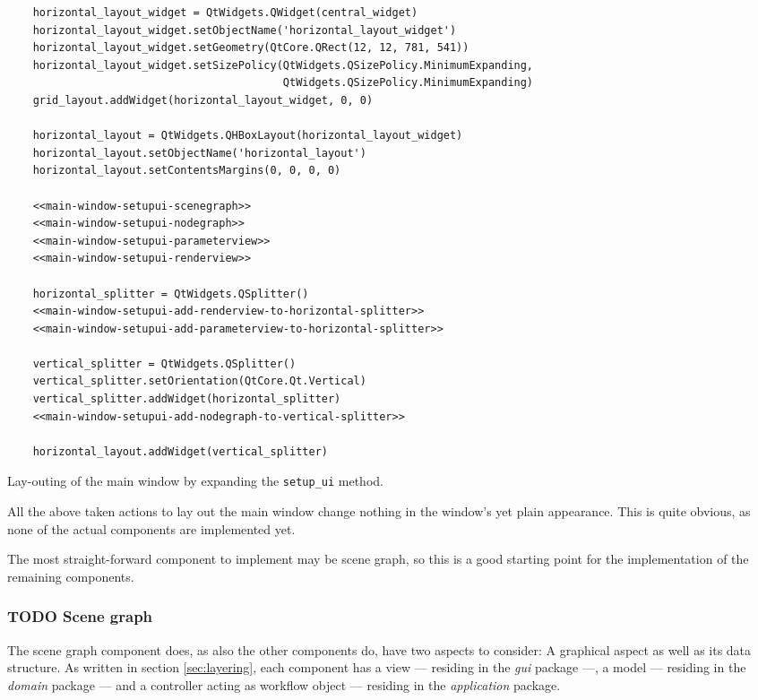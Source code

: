 \documentclass[10pt, openright, notitlepage]{scrreprt}
\begin{document}
\begin{listing}[H]
\begin{verbatim}
    horizontal_layout_widget = QtWidgets.QWidget(central_widget)
    horizontal_layout_widget.setObjectName('horizontal_layout_widget')
    horizontal_layout_widget.setGeometry(QtCore.QRect(12, 12, 781, 541))
    horizontal_layout_widget.setSizePolicy(QtWidgets.QSizePolicy.MinimumExpanding,
                                           QtWidgets.QSizePolicy.MinimumExpanding)
    grid_layout.addWidget(horizontal_layout_widget, 0, 0)

    horizontal_layout = QtWidgets.QHBoxLayout(horizontal_layout_widget)
    horizontal_layout.setObjectName('horizontal_layout')
    horizontal_layout.setContentsMargins(0, 0, 0, 0)

    <<main-window-setupui-scenegraph>>
    <<main-window-setupui-nodegraph>>
    <<main-window-setupui-parameterview>>
    <<main-window-setupui-renderview>>

    horizontal_splitter = QtWidgets.QSplitter()
    <<main-window-setupui-add-renderview-to-horizontal-splitter>>
    <<main-window-setupui-add-parameterview-to-horizontal-splitter>>

    vertical_splitter = QtWidgets.QSplitter()
    vertical_splitter.setOrientation(QtCore.Qt.Vertical)
    vertical_splitter.addWidget(horizontal_splitter)
    <<main-window-setupui-add-nodegraph-to-vertical-splitter>>

    horizontal_layout.addWidget(vertical_splitter)
\end{verbatim}
\caption{\label{main-window-setupui}
Lay-outing of the main window by expanding the \texttt{setup\_ui} method.}
\end{listing}

All the above taken actions to lay out the main window change nothing in the
window's yet plain appearance. This is quite obvious, as none of the actual
components are implemented yet.

The most straight-forward component to implement may be scene graph, so this is
a good starting point for the implementation of the remaining components.

\subsubsection{{\bfseries\sffamily TODO} Scene graph}
\label{sec:orgfd7fafd}

The scene graph component does, as also the other components do, have two
aspects to consider: A graphical aspect as well as its data structure. As
written in section \ref{sec:layering}, each component has a view --- residing in the \emph{gui}
package ---, a model --- residing in the \emph{domain} package --- and a controller
acting as workflow object --- residing in the \emph{application} package.
\end{document}
